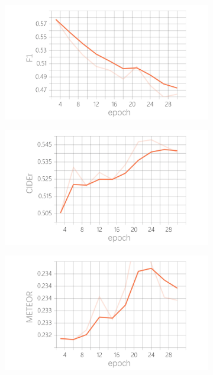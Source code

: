 \documentclass[12pt]{article}
\begin{document}
\begin{figure}[h]
	\centering
	\begin{subfigure}{0.49\textwidth}
		\includegraphics[width=\linewidth]{Plot/F1.png}
	\end{subfigure}
	\begin{subfigure}{0.49\textwidth}
		\includegraphics[width=\linewidth]{Plot/CIDEr.png}
	\end{subfigure}
	\begin{subfigure}{0.49\textwidth}
		\includegraphics[width=\linewidth]{Plot/METEOR.png}

\end{subfigure}
\end{figure}
\end{document}
